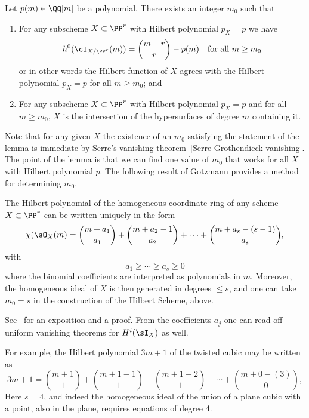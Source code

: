 \begin{lemma}\label{matsusaka}
Let $p(m) \in \QQ[m]$ be a polynomial. There exists an integer $m_0$ such that

\begin{enumerate}  

\item For any subscheme $X \subset \PP^r$ with Hilbert polynomial $p_X = p$ we have
$$
h^0(\cI_{X/\PP^r}(m)) = \binom{m+r}{r} - p(m) \quad \text{for all } m \geq m_0
$$
or in other words the Hilbert function of $X$ agrees with the Hilbert polynomial $p_X = p$ for all $m \geq m_0$; and

\item For any subscheme $X \subset \PP^r$ with Hilbert polynomial $p_X = p$ and for all $m \geq m_0$, $X$ is the intersection of the hypersurfaces of degree $m$ containing it.
\end{enumerate}
\end{lemma}
Note that  for any given $X$ the existence of an $m_0$ satisfying the statement of the lemma is immediate by Serre's vanishing theorem~\ref{Serre-Grothendieck vanishing}. The point of the lemma is that we can find one value of $m_0$ that works for all $X$ with Hilbert polynomial $p$. The following result of Gotzmann provides a method for determining $m_0$. 

\begin{theorem}
The Hilbert polynomial  of the homogeneous coordinate ring of any scheme $X\subset \PP^r$ can be written uniquely in the form
$$
\chi(\sO_X(m) = {m+a_1\choose a_1}+ {m+a_2 -1\choose a_2}+ \cdots+{m+a_s -(s-1)\choose a_s},
$$
with 
$$
a_1\geq \cdots \geq a_s \geq 0
$$
where the binomial coefficients are interpreted as polynomials in $m$. Moreover, the homogeneous ideal of $X$ is
then generated in degrees $\leq s$, and one can take $m_0 = s$ in the construction of the Hilbert Scheme, above.
\end{theorem}
See~\cite{MR1023391} %
for an exposition and a proof. From the coefficients $a_j$ one can read off uniform vanishing theorems for $H^i(\sI_X)$
 as well.
 
 For example, the Hilbert polynomial $3m+1$ of the twisted cubic may be written as
 $$
 3m+1 =  {m+1\choose 1}+ {m+1 -1\choose 1}+{m+1 -2\choose 1}+ \cdots+{m+0 -(3)\choose 0},
 $$
 Here $s=4$, and indeed the homogeneous ideal of the union of a plane cubic with a point, also in the plane,
 requires equations of degree 4.
 
